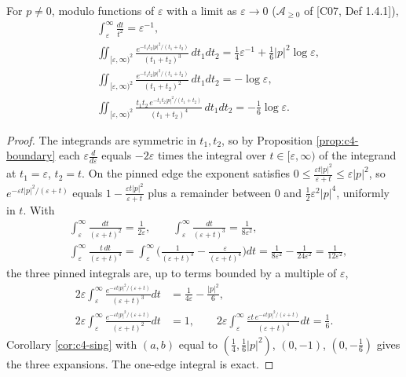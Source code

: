 \begin{lemma}
\label{lem:c4-integrals}
For $p\neq0$, modulo functions of $\varepsilon$ with a limit as $\varepsilon\to0$ ($\mathscr A_{\ge0}$ of [C07, Def 1.4.1]),
\[
\begin{aligned}
&\int_\varepsilon^\infty\frac{dt}{t^2}=\varepsilon^{-1},\\
&\iint_{[\varepsilon,\infty)^2}\frac{e^{-t_1t_2|p|^2/(t_1+t_2)}}{(t_1+t_2)^3}\,dt_1dt_2=\tfrac14\varepsilon^{-1}+\tfrac16|p|^2\log\varepsilon,\\
&\iint_{[\varepsilon,\infty)^2}\frac{e^{-t_1t_2|p|^2/(t_1+t_2)}}{(t_1+t_2)^2}\,dt_1dt_2=-\log\varepsilon,\\
&\iint_{[\varepsilon,\infty)^2}\frac{t_1t_2\,e^{-t_1t_2|p|^2/(t_1+t_2)}}{(t_1+t_2)^4}\,dt_1dt_2=-\tfrac16\log\varepsilon.
\end{aligned}
\]
\end{lemma}

\begin{proof}
The integrands are symmetric in $t_1,t_2$, so by Proposition \ref{prop:c4-boundary} each $\varepsilon\frac{d}{d\varepsilon}$ equals $-2\varepsilon$ times the integral over $t\in[\varepsilon,\infty)$ of the integrand at $t_1=\varepsilon$, $t_2=t$. On the pinned edge the exponent satisfies $0\le\frac{\varepsilon t|p|^2}{\varepsilon+t}\le\varepsilon|p|^2$, so $e^{-\varepsilon t|p|^2/(\varepsilon+t)}$ equals $1-\frac{\varepsilon t|p|^2}{\varepsilon+t}$ plus a remainder between $0$ and $\tfrac12\varepsilon^2|p|^4$, uniformly in $t$. With
\[
\begin{aligned}
&\int_\varepsilon^\infty\frac{dt}{(\varepsilon+t)^2}=\frac1{2\varepsilon},\qquad \int_\varepsilon^\infty\frac{dt}{(\varepsilon+t)^3}=\frac1{8\varepsilon^2},\\
&\int_\varepsilon^\infty\frac{t\,dt}{(\varepsilon+t)^4}=\int_\varepsilon^\infty\Big(\frac1{(\varepsilon+t)^3}-\frac{\varepsilon}{(\varepsilon+t)^4}\Big)dt=\frac1{8\varepsilon^2}-\frac1{24\varepsilon^2}=\frac1{12\varepsilon^2},
\end{aligned}
\]
the three pinned integrals are, up to terms bounded by a multiple of $\varepsilon$,
\[
\begin{aligned}
2\varepsilon\int_\varepsilon^\infty\frac{e^{-\varepsilon t|p|^2/(\varepsilon+t)}}{(\varepsilon+t)^3}dt&=\frac{1}{4\varepsilon}-\frac{|p|^2}{6},\\
2\varepsilon\int_\varepsilon^\infty\frac{e^{-\varepsilon t|p|^2/(\varepsilon+t)}}{(\varepsilon+t)^2}dt&=1,\qquad
2\varepsilon\int_\varepsilon^\infty\frac{\varepsilon t\,e^{-\varepsilon t|p|^2/(\varepsilon+t)}}{(\varepsilon+t)^4}dt=\frac16 .
\end{aligned}
\]
Corollary \ref{cor:c4-sing} with $(a,b)$ equal to $(\tfrac14,\tfrac16|p|^2)$, $(0,-1)$, $(0,-\tfrac16)$ gives the three expansions. The one-edge integral is exact.
\end{proof}

